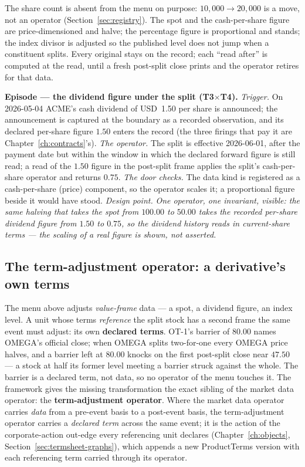 \documentclass[11pt,a4paper]{article}
\newcommand{\USD}[1]{\mbox{USD~#1}}
\begin{document}
\noindent The share count is absent from the menu on purpose: $10{,}000 \rightarrow
20{,}000$ is a move, not an operator (Section~\ref{sec:registry}). The spot and the
cash-per-share figure are price-dimensioned and halve; the percentage figure is
proportional and stands; the index divisor is adjusted so the published level does not jump
when a constituent splits. Every original stays on the record; each ``read after'' is
computed at the read, until a fresh post-split close prints and the operator retires for
that data.

\medskip\noindent\textbf{Episode --- the dividend figure under the split (T3$\times$T4).}
\emph{Trigger.} On 2026-05-04 ACME's cash dividend of \USD{1.50} per share is announced;
the announcement is captured at the boundary as a recorded observation, and its declared
per-share figure $1.50$ enters the record (the three firings that pay it are
Chapter~\ref{ch:contracts}'s). \emph{The operator.} The split is effective 2026-06-01,
after the payment date but within the window in which the declared forward figure is still
read; a read of the $1.50$ figure in the post-split frame applies the split's
cash-per-share operator and returns $0.75$. \emph{The door checks.} The data kind is
registered as a cash-per-share (price) component, so the operator scales it; a proportional
figure beside it would have stood. \emph{Design point.} \emph{One operator, one invariant,
visible: the same halving that takes the spot from $100.00$ to $50.00$ takes the recorded
per-share dividend figure from $1.50$ to $0.75$, so the dividend history reads in
current-share terms --- the scaling of a real figure is shown, not asserted.}

\subsection{The term-adjustment operator: a derivative's own terms}\label{sec:term-operator}

The menu above adjusts \emph{value-frame} data --- a spot, a dividend figure, an index
level. A unit whose terms \emph{reference} the split stock has a second frame the same event
must adjust: its own \textbf{declared terms}. OT-1's barrier of $80.00$ names OMEGA's
official close; when OMEGA splits two-for-one every OMEGA price halves, and a barrier left at
$80.00$ knocks on the first post-split close near $47.50$ --- a stock at half its former level
meeting a barrier struck against the whole. The barrier is a declared term, not data, so
no operator of the menu touches it. The framework gives the missing transformation the exact
sibling of the market data operator: the \textbf{term-adjustment operator}. Where the market
data operator carries \emph{data} from a pre-event basis to a post-event basis, the
term-adjustment operator carries a \emph{declared term} across the same event; it is the
action of the corporate-action out-edge every referencing unit declares
(Chapter~\ref{ch:objects}, Section~\ref{sec:termsheet-graphs}), which appends a new
ProductTerms version with each referencing term carried through its operator.
\end{document}
